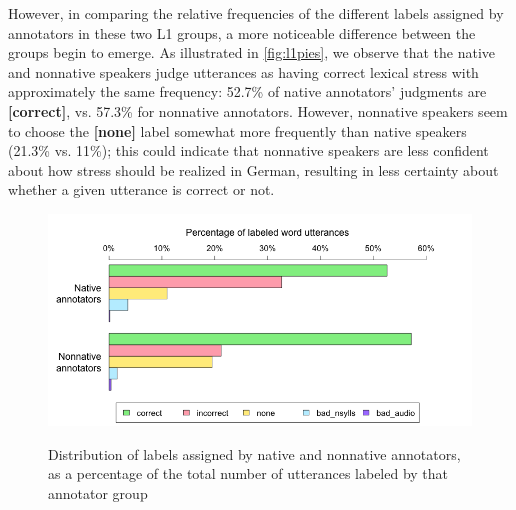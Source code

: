 		However, in comparing the relative frequencies of the different labels assigned by annotators in these two L1 groups, a more noticeable difference between the groups begin to emerge. As illustrated in \cref{fig:l1pies}, we observe that the native and nonnative speakers judge utterances as having correct lexical stress with approximately the same frequency: 52.7\% of native annotators' judgments are \textbf{[correct]}, vs. 57.3\% for nonnative annotators. However, nonnative speakers seem to choose the \textbf{[none]}
		label somewhat more frequently than native speakers (21.3\% vs. 11\%); this could indicate that nonnative speakers are less confident about how stress should be realized in German, resulting in less certainty about whether a given utterance is correct or not. 
		
		
			\begin{figure}[htb]
				\centering
				\caption[Distribution of labels by annotator L1]{Distribution of labels assigned by native and nonnative annotators,
				as a percentage of the total number of utterances labeled by that annotator group
				}
				\includegraphics[width=\textwidth]{img/plots/pctJudgmentsByL1-notStacked}
				\label{fig:agreement:l1bars}
			\end{figure}
			
